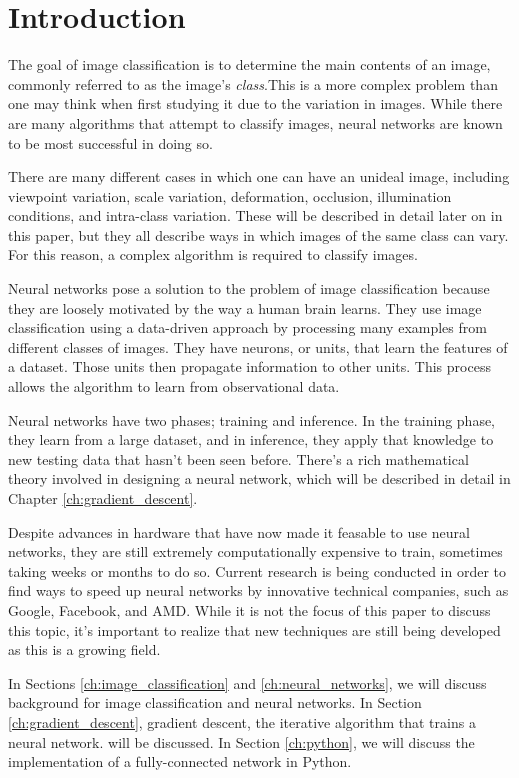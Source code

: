 \newpage
\section{Introduction}

The goal of image classification is to determine the main contents of an image,
commonly referred to as the image's \textit{class}.This is a more complex
problem than one may think when first studying it due to the variation in
images. While there are many algorithms that attempt to classify images, neural
networks are known to be most successful in doing so.

There are many different cases in which one can have an unideal image,
including viewpoint variation, scale variation, deformation, occlusion,
illumination conditions, and intra-class variation. These will be described in
detail later on in this paper, but they all describe ways in which images of
the same class can vary. For this reason, a complex algorithm is required to
classify images.

Neural networks pose a solution to the problem of image classification because
they are loosely motivated by the way a human brain learns. They use
image classification using a data-driven approach by processing many
examples from different classes of images. They have neurons, or units, that
learn the features of a dataset. Those units then propagate information to
other units. This process allows the algorithm to learn from observational data.

Neural networks have two phases; training and inference. In the training phase,
they learn from a large dataset, and in inference, they apply that knowledge to
new testing data that hasn't been seen before. There's a rich mathematical
theory involved in designing a neural network, which will be described in
detail in Chapter \ref{ch:gradient_descent}.

Despite advances in hardware that have now made it feasable to use neural
networks, they are still extremely computationally expensive to train,
sometimes taking weeks or months to do so. Current research is being conducted
in order to find ways to speed up neural networks by innovative technical
companies, such as Google, Facebook, and AMD. While it is not the focus of this
paper to discuss this topic, it's important to realize that new techniques are
still being developed as this is a growing field.

In Sections \ref{ch:image_classification} and \ref{ch:neural_networks}, we will
discuss background for image classification and neural networks. In Section
\ref{ch:gradient_descent}, gradient descent, the iterative algorithm that
trains a neural network. will be discussed. In Section \ref{ch:python}, we will
discuss the implementation of a fully-connected network in Python.

